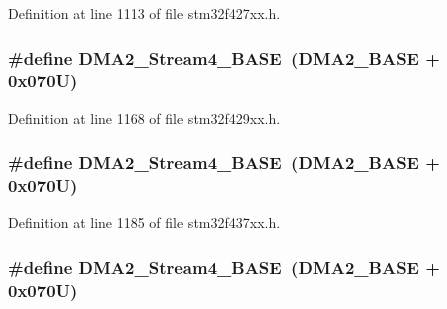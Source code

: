 Definition at line 1113 of file stm32f427xx.\+h.

\subsubsection[{\texorpdfstring{D\+M\+A2\+\_\+\+Stream4\+\_\+\+B\+A\+SE}{DMA2_Stream4_BASE}}]{\setlength{\rightskip}{0pt plus 5cm}\#define D\+M\+A2\+\_\+\+Stream4\+\_\+\+B\+A\+SE~({\bf D\+M\+A2\+\_\+\+B\+A\+SE} + 0x070\+U)}\hypertarget{group___peripheral__memory__map_gad1e67740e6301233473f64638145dd1f}{}\label{group___peripheral__memory__map_gad1e67740e6301233473f64638145dd1f}


Definition at line 1168 of file stm32f429xx.\+h.

\subsubsection[{\texorpdfstring{D\+M\+A2\+\_\+\+Stream4\+\_\+\+B\+A\+SE}{DMA2_Stream4_BASE}}]{\setlength{\rightskip}{0pt plus 5cm}\#define D\+M\+A2\+\_\+\+Stream4\+\_\+\+B\+A\+SE~({\bf D\+M\+A2\+\_\+\+B\+A\+SE} + 0x070\+U)}\hypertarget{group___peripheral__memory__map_gad1e67740e6301233473f64638145dd1f}{}\label{group___peripheral__memory__map_gad1e67740e6301233473f64638145dd1f}


Definition at line 1185 of file stm32f437xx.\+h.

\subsubsection[{\texorpdfstring{D\+M\+A2\+\_\+\+Stream4\+\_\+\+B\+A\+SE}{DMA2_Stream4_BASE}}]{\setlength{\rightskip}{0pt plus 5cm}\#define D\+M\+A2\+\_\+\+Stream4\+\_\+\+B\+A\+SE~({\bf D\+M\+A2\+\_\+\+B\+A\+SE} + 0x070\+U)}\hypertarget{group___peripheral__memory__map_gad1e67740e6301233473f64638145dd1f}{}\label{group___peripheral__memory__map_gad1e67740e6301233473f64638145dd1f}


